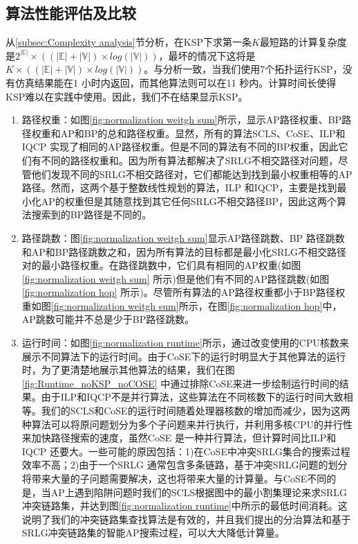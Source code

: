 \subsection{算法性能评估及比较}
从\ref{subsec:Complexity analysis}节分析，在KSP下求第一条$K$最短路的计算复杂度是$2^{|\mathbb{E}|}\times ((|\mathbb{E}|+|\mathbb{V}|)\times log(|\mathbb{V}|))$，最坏的情况下这将是$K\times ((|\mathbb{E}|+|\mathbb{V}|)\times log(|\mathbb{V}|))$。与分析一致，当我们使用7个拓扑运行KSP，没有仿真结果能在1 小时内返回，而其他算法则可以在11 秒内。计算时间长使得KSP难以在实践中使用。因此，我们不在结果显示KSP。
\begin{enumerate}
  \item 路径权重：如图\ref{fig:normalization weitgh sum}所示，显示AP路径权重、BP路径权重和AP和BP的总和路径权重。显然，所有的算法SCLS、CoSE、ILP和IQCP 实现了相同的AP路径权重。但是不同的算法有不同的BP权重，因此它们有不同的路径权重和。因为所有算法都解决了SRLG不相交路径对问题，尽管他们发现不同的SRLG不相交路径对，它们都能达到找到最小权重相等的AP路径。然而，这两个基于整数线性规划的算法，ILP 和IQCP，主要是找到最小化AP的权重但是其随意找到其它任何SRLG不相交路径BP，因此这两个算法搜索到的BP路径是不同的。
  \item 路径跳数：图\ref{fig:normalization weitgh sum}显示AP路径跳数、BP 路径跳数和AP和BP路径跳数之和，因为所有算法的目标都是最小化SRLG不相交路径对的最小路径权重。在路径跳数中，它们具有相同的AP权重(如图\ref{fig:normalization weitgh sum} 所示)但是他们有不同的AP路径跳数(如图\ref{fig:normalization hop} 所示)。尽管所有算法的AP路径权重都小于BP路径权重如图\ref{fig:normalization weitgh sum}所示，在图\ref{fig:normalization hop}中，AP跳数可能并不总是少于BP路径跳数。
  \item 运行时间：如图\ref{fig:normalization runtime}所示，通过改变使用的CPU核数来展示不同算法下的运行时间。由于CoSE下的运行时明显大于其他算法的运行时，为了更清楚地展示其他算法的结果，我们在图\ref{fig:Runtime_noKSP_noCOSE} 中通过排除CoSE来进一步绘制运行时间的结果。由于ILP和IQCP不是并行算法，这些算法在不同核数下的运行时间大致相等。我们的SCLS和CoSE的运行时间随着处理器核数的增加而减少，因为这两种算法可以将原问题划分为多个子问题来并行执行，并利用多核CPU的并行性来加快路径搜索的速度，虽然CoSE 是一种并行算法，但计算时间比ILP和IQCP 还要大。一些可能的原因包括：1)在CoSE中冲突SRLG集合的搜索过程效率不高；2)由于一个SRLG 通常包含多条链路，基于冲突SRLG问题的划分将带来大量的子问题需要解决，这也将带来大量的计算量。与CoSE不同的是，当AP上遇到陷阱问题时我们的SCLS根据图中的最小割集理论来求SRLG冲突链路集，并达到图\ref{fig:normalization runtime}中所示的最低时间消耗。这说明了我们的冲突链路集查找算法是有效的，并且我们提出的分治算法和基于SRLG冲突链路集的智能AP搜索过程，可以大大降低计算量。

\end{enumerate}
